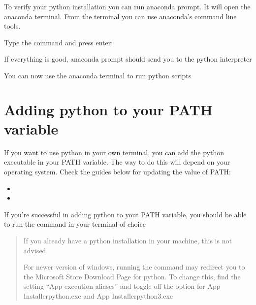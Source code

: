 \documentclass[letterpaper,10pt,english]{jupyterBook}
\begin{document}
\sphinxAtStartPar
To verify your python installation you can run anaconda prompt. It will open the anaconda terminal. From the terminal you can use anaconda’s command line tools.

\sphinxAtStartPar
Type the command  and press enter:

\sphinxAtStartPar
{}

\sphinxAtStartPar
If everything is good, anaconda prompt should send you to the python interpreter

\sphinxAtStartPar
{}

\sphinxAtStartPar
You can now use the anaconda terminal to run python scripts


\section{Adding python to your PATH variable}
\label{\detokenize{installing-python:adding-python-to-your-path-variable}}
\sphinxAtStartPar
If you want to use python in your own terminal, you can add the python executable in your PATH variable.
The way to do this will depend on your operating system.
Check the guides below for updating the value of PATH:
\begin{itemize}
\item {} 
\sphinxAtStartPar
{}

\item {} 
\sphinxAtStartPar
{}

\end{itemize}

\sphinxAtStartPar
If you’re successful in adding python to yout PATH variable, you should be able to run the  command in your terminal of choice
\begin{quote}

\sphinxAtStartPar
If you already have a python installation in your machine, this is not advised.

\sphinxAtStartPar
For newer version of windows, running the  command may redirect you to the Microsoft Store Download Page for python. To change this, find the setting “App execution aliases” and toggle off the option for App Installer\sphinxhyphen{}python.exe and App Installer\sphinxhyphen{}python3.exe
\end{quote}
\end{document}
